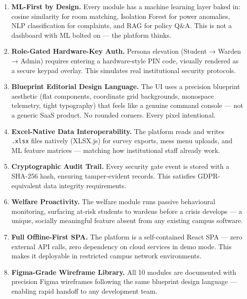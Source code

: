 \documentclass[12pt, a4paper]{article}
\begin{document}
\begin{enumerate}[leftmargin=1.4em, itemsep=8pt]

  \item \textbf{ML-First by Design.} Every module has a machine learning layer baked in: cosine similarity for room matching, Isolation Forest for power anomalies, NLP classification for complaints, and RAG for policy Q\&A. This is not a dashboard with ML bolted on — the platform thinks.

  \item \textbf{Role-Gated Hardware-Key Auth.} Persona elevation (Student → Warden → Admin) requires entering a hardware-style PIN code, visually rendered as a secure keypad overlay. This simulates real institutional security protocols.

  \item \textbf{Blueprint Editorial Design Language.} The UI uses a precision blueprint aesthetic (flat components, coordinate grid backgrounds, monospace telemetry, tight typography) that feels like a genuine command console — not a generic SaaS product. No rounded corners. Every pixel intentional.

  \item \textbf{Excel-Native Data Interoperability.} The platform reads and writes \texttt{.xlsx} files natively (XLSX.js) for survey exports, mess menu uploads, and ML feature matrices — matching how institutional staff already work.

  \item \textbf{Cryptographic Audit Trail.} Every security gate event is stored with a SHA-256 hash, ensuring tamper-evident records. This satisfies GDPR-equivalent data integrity requirements.

  \item \textbf{Welfare Proactivity.} The welfare module runs passive behavioural monitoring, surfacing at-risk students to wardens before a crisis develops — a unique, socially meaningful feature absent from any existing campus software.

  \item \textbf{Full Offline-First SPA.} The platform is a self-contained React SPA — zero external API calls, zero dependency on cloud services in demo mode. This makes it deployable in restricted campus network environments.

  \item \textbf{Figma-Grade Wireframe Library.} All 10 modules are documented with precision Figma wireframes following the same blueprint design language — enabling rapid handoff to any development team.

\end{enumerate}
\end{document}
